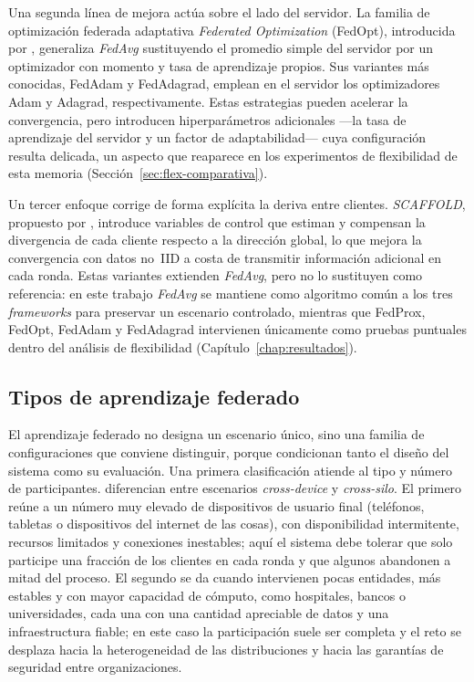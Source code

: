 Una segunda línea de mejora actúa sobre el lado del servidor. La familia de optimización
federada adaptativa \textit{Federated Optimization} (FedOpt), introducida por
\textcite{reddi2021adaptive}, generaliza \textit{FedAvg} sustituyendo el promedio simple
del servidor por un optimizador con momento y tasa de aprendizaje propios. Sus variantes
más conocidas, FedAdam y FedAdagrad, emplean en el servidor los optimizadores Adam y
Adagrad, respectivamente. Estas estrategias pueden acelerar la convergencia, pero
introducen hiperparámetros adicionales —la tasa de aprendizaje del servidor y un factor de
adaptabilidad— cuya configuración resulta delicada, un aspecto que reaparece en los
experimentos de flexibilidad de esta memoria (Sección~\ref{sec:flex-comparativa}).

Un tercer enfoque corrige de forma explícita la deriva entre clientes. \textit{SCAFFOLD},
propuesto por \textcite{karimireddy2020scaffold}, introduce variables de control que
estiman y compensan la divergencia de cada cliente respecto a la dirección global, lo que
mejora la convergencia con datos no~IID a costa de transmitir información adicional en cada
ronda. Estas variantes extienden \textit{FedAvg}, pero no lo sustituyen como referencia: en
este trabajo \textit{FedAvg} se mantiene como algoritmo común a los tres
\textit{frameworks} para preservar un escenario controlado, mientras que FedProx, FedOpt,
FedAdam y FedAdagrad intervienen únicamente como pruebas puntuales dentro del análisis de
flexibilidad (Capítulo~\ref{chap:resultados}).

\subsection{Tipos de aprendizaje federado}\label{sec:tipos}

El aprendizaje federado no designa un escenario único, sino una familia de
configuraciones que conviene distinguir, porque condicionan tanto el diseño del sistema
como su evaluación. Una primera clasificación atiende al tipo y número de participantes.
\textcite{kairouz2021advances} diferencian entre escenarios \textit{cross-device} y
\textit{cross-silo}. El primero reúne a un número muy elevado de dispositivos de usuario
final (teléfonos, tabletas o dispositivos del internet de las cosas), con disponibilidad
intermitente, recursos limitados y conexiones inestables; aquí el sistema debe tolerar
que solo participe una fracción de los clientes en cada ronda y que algunos abandonen a
mitad del proceso. El segundo se da cuando intervienen pocas entidades, más estables y
con mayor capacidad de cómputo, como hospitales, bancos o universidades, cada una con una
cantidad apreciable de datos y una infraestructura fiable; en este caso la participación
suele ser completa y el reto se desplaza hacia la heterogeneidad de las distribuciones y
hacia las garantías de seguridad entre organizaciones.

